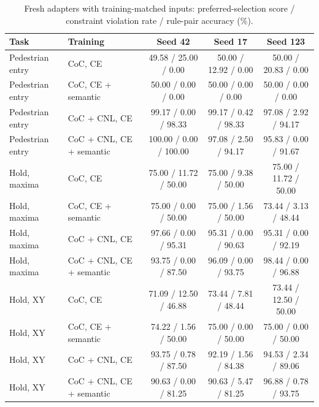 \documentclass[10pt]{article}
\begin{document}
\begin{table}[h]
\centering\footnotesize
\caption{Fresh adapters with training-matched inputs: preferred-selection score / constraint violation rate / rule-pair accuracy (\%).}
\label{tab:sup-fresh}
\begin{tabular}{llccc}
\toprule
Task & Training & Seed 42 & Seed 17 & Seed 123\\
\midrule
Pedestrian entry & CoC, CE & 49.58 / 25.00 / 0.00 & 50.00 / 12.92 / 0.00 & 50.00 / 20.83 / 0.00\\
Pedestrian entry & CoC, CE + semantic & 50.00 / 0.00 / 0.00 & 50.00 / 0.00 / 0.00 & 50.00 / 0.00 / 0.00\\
Pedestrian entry & CoC + CNL, CE & 99.17 / 0.00 / 98.33 & 99.17 / 0.42 / 98.33 & 97.08 / 2.92 / 94.17\\
Pedestrian entry & CoC + CNL, CE + semantic & 100.00 / 0.00 / 100.00 & 97.08 / 2.50 / 94.17 & 95.83 / 0.00 / 91.67\\
Hold, maxima & CoC, CE & 75.00 / 11.72 / 50.00 & 75.00 / 9.38 / 50.00 & 75.00 / 11.72 / 50.00\\
Hold, maxima & CoC, CE + semantic & 75.00 / 0.00 / 50.00 & 75.00 / 1.56 / 50.00 & 73.44 / 3.13 / 48.44\\
Hold, maxima & CoC + CNL, CE & 97.66 / 0.00 / 95.31 & 95.31 / 0.00 / 90.63 & 95.31 / 0.00 / 92.19\\
Hold, maxima & CoC + CNL, CE + semantic & 93.75 / 0.00 / 87.50 & 96.09 / 0.00 / 93.75 & 98.44 / 0.00 / 96.88\\
Hold, XY & CoC, CE & 71.09 / 12.50 / 46.88 & 73.44 / 7.81 / 48.44 & 73.44 / 12.50 / 50.00\\
Hold, XY & CoC, CE + semantic & 74.22 / 1.56 / 50.00 & 75.00 / 0.00 / 50.00 & 75.00 / 0.00 / 50.00\\
Hold, XY & CoC + CNL, CE & 93.75 / 0.78 / 87.50 & 92.19 / 1.56 / 84.38 & 94.53 / 2.34 / 89.06\\
Hold, XY & CoC + CNL, CE + semantic & 90.63 / 0.00 / 81.25 & 90.63 / 5.47 / 81.25 & 96.88 / 0.78 / 93.75\\
\bottomrule
\end{tabular}
\end{table}
\end{document}
